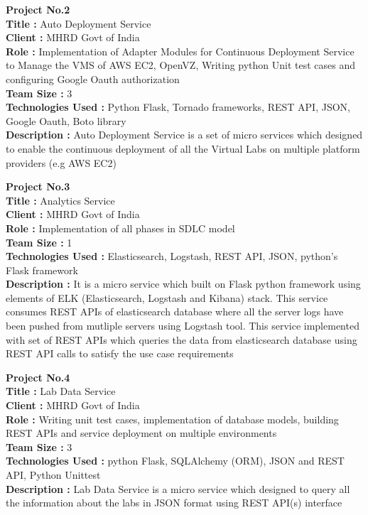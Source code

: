 \documentclass{resume} %
\begin{document}
\bigskip

\textbf {Project No.2} \\ \textbf{Title : } Auto Deployment Service
\\ \textbf{Client : } MHRD Govt of India \\ \textbf{Role : }
Implementation of Adapter Modules for Continuous Deployment Service to
Manage the VMS of AWS EC2, OpenVZ, Writing python Unit test cases and
configuring Google Oauth authorization \\ \textbf{Team Size : } 3
\\ \textbf{Technologies Used :} Python Flask, Tornado frameworks, REST
API, JSON, Google Oauth, Boto library \\ \textbf{Description :} Auto
Deployment Service is a set of micro services which designed to enable
the continuous deployment of all the Virtual Labs on multiple platform
providers (e.g AWS EC2)



\bigskip

\textbf {Project No.3} \\ \textbf{Title : } Analytics Service
\\ \textbf{Client : } MHRD Govt of India \\ \textbf{Role : }
Implementation of all phases in SDLC model \\ \textbf{Team Size : } 1
\\ \textbf{Technologies Used :} Elasticsearch, Logstash, REST API,
JSON, python's Flask framework \\ \textbf{Description :} It is a micro
service which built on Flask python framework using elements of ELK
(Elasticsearch, Logstash and Kibana) stack. This service consumes REST
APIs of elasticsearch database where all the server logs have been
pushed from mutliple servers using Logstash tool. This service
implemented with set of REST APIs which queries the data from
elasticsearch database using REST API calls to satisfy the use case
requirements


\bigskip

\textbf {Project No.4} \\ \textbf{Title : } Lab Data Service
\\ \textbf{Client : } MHRD Govt of India \\ \textbf{Role : } Writing
unit test cases, implementation of database models, building REST APIs
and service deployment on multiple environments \\ \textbf{Team Size :
} 3 \\ \textbf{Technologies Used :} python Flask, SQLAlchemy (ORM),
JSON and REST API, Python Unittest \\ \textbf{Description :} Lab Data
Service is a micro service which designed to query all the information
about the labs in JSON format using REST API(s) interface
\end{document}
